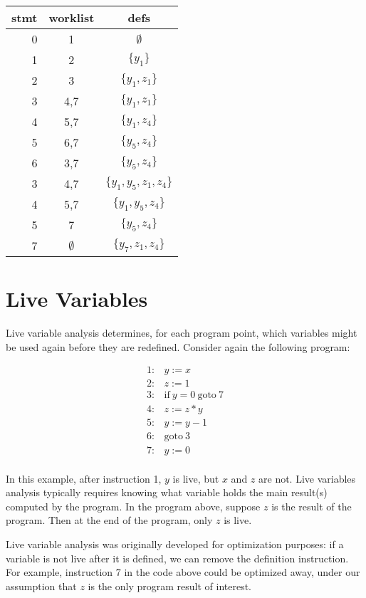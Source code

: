 \documentclass[11pt]{article}
\begin{document}
\begin{centering}
\begin{tabular}{r | c | c}

stmt & worklist & defs \\
\hline
0  & 1   & $\emptyset$ \\
1  & 2   & $\{ y_1 \}$ \\
2  & 3   & $\{ y_1,z_1 \}$ \\
3  & 4,7   & $\{ y_1,z_1 \}$ \\
4  & 5,7   & $\{ y_1,z_4 \}$ \\
5  & 6,7   & $\{ y_5,z_4 \}$ \\
6  & 3,7   & $\{ y_5,z_4 \}$ \\
3  & 4,7   & $\{ y_1,y_5,z_1,z_4 \}$ \\
4  & 5,7   & $\{ y_1,y_5,z_4 \}$ \\
5  & 7     & $\{ y_5,z_4 \}$ \\
7  & $\emptyset$ & $\{ y_7,z_1,z_4 \}$ \\

\end{tabular}
\end{centering}


\section{Live Variables}

Live variable analysis determines, for each program point, which variables might be used again before they are redefined.  Consider again the following program:

\[
\begin{array}{ll}
1: & y := x\\
2: & z := 1\\
3: & \mbox{if}~ y = 0 ~\mbox{goto}~ 7\\
4: & z := z * y\\
5: & y := y - 1\\
6: & \mbox{goto}~ 3\\
7: & y := 0\\
\end{array}
\]

In this example, after instruction 1, $y$ is live, but $x$ and $z$ are not.  Live variables analysis typically requires knowing what variable holds the main result(s) computed by the program.  In the program above, suppose $z$ is the result of the program.  Then at the end of the program, only $z$ is live.

Live variable analysis was originally developed for optimization purposes: if a variable is not live after it is defined, we can remove the definition instruction.  For example, instruction 7 in the code above could be optimized away, under our assumption that $z$ is the only program result of interest.
\end{document}
